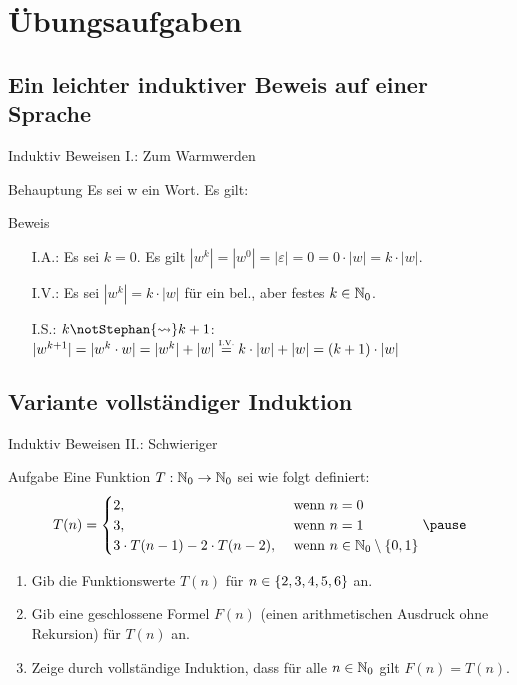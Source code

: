 \section{Übungsaufgaben}
\subsection{Ein leichter induktiver Beweis auf einer Sprache}
\begin{frame}{Induktiv Beweisen I.: Zum Warmwerden}
	\begin{exampleblock}{Behauptung}
		Es sei w ein Wort. Es gilt:\\
	\end{exampleblock}
\pause
	\begin{block}{Beweis}
		\begin{itemize}
			\item[I.A.:] Es sei $k=0$. Es gilt $|w^k|=|w^0|=|\varepsilon|=0=0 \cdot |w| = k \cdot |w|$.
			\item[I.V.:] Es sei $|w^k|=k \cdot |w|$ für ein bel., aber festes $k\in \mathbb{N}_0$.
			\item[I.S.:] $k \Stephan{\curvearrowright} \notStephan{\leadsto} k+1$:\\
						 $|w^{k+1}|=|w^k \cdot w|=|w^k|+|w| \eqtext{I.V.} k \cdot |w| + |w| = (k+1) \cdot |w|$
		\end{itemize}
	\end{block}
\end{frame}
\subsection{Variante vollständiger Induktion} %
\begin{frame}{Induktiv Beweisen II.: Schwieriger}
	\begin{exampleblock}{Aufgabe}
		Eine Funktion $T:\mathbb{N}_0 \rightarrow \mathbb{N}_0$ sei wie folgt definiert:
		\begin{equation*}
		T(n) = 
			\begin{cases}
			 2, &\text{ wenn } n=0 \\
			 3, &\text{ wenn } n=1 \\
			 3 \cdot T(n-1) - 2 \cdot T(n-2), &\text{ wenn }n \in \nN_0 \setminus \set{0,1}
		\end{cases} \pause
		\end{equation*}
		\begin{enumerate}
			\item Gib die Funktionswerte $T(n)$ für $n \in \left\{ 2,3,4,5,6 \right\}$ an.
			\item Gib eine geschlossene Formel $F(n)$ (einen arithmetischen Ausdruck ohne Rekursion) für $T(n)$ an.
			\item Zeige durch vollständige Induktion, dass für alle $n \in \mathbb{N}_0$ gilt $F(n) = T(n)$.
		\end{enumerate}
	\end{exampleblock}
\end{frame}
